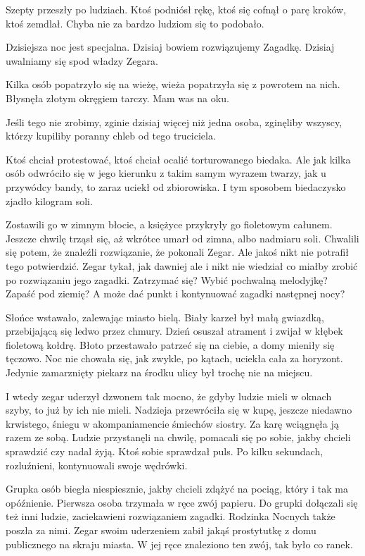 Szepty przeszły po ludziach.
Ktoś podniósł rękę, ktoś się cofnął o parę kroków, ktoś zemdlał.
Chyba nie za bardzo ludziom się to podobało.
\begin{dialogue}
	\ds{} Dzisiejsza noc jest specjalna. Dzisiaj bowiem rozwiązujemy Zagadkę. Dzisiaj uwalniamy się spod władzy Zegara.
\end{dialogue}
Kilka osób popatrzyło się na wieżę, wieża popatrzyła się z powrotem na nich. Błysnęła złotym okręgiem tarczy. Mam was na oku.
\begin{dialogue}
	\ds{} Jeśli tego nie zrobimy, zginie dzisiaj więcej niż jedna osoba, zginęliby wszyscy, którzy kupiliby poranny chleb od tego truciciela.
\end{dialogue}
Ktoś chciał protestować, ktoś chciał ocalić torturowanego biedaka.
Ale jak kilka osób odwróciło się w jego kierunku z takim samym wyrazem twarzy, jak u przywódcy bandy, to zaraz uciekł od zbiorowiska.
I tym sposobem biedaczysko zjadło kilogram soli.

Zostawili go w zimnym błocie, a księżyce przykryły go fioletowym całunem.
Jeszcze chwilę trząsł się, aż wkrótce umarł od zimna, albo nadmiaru soli.
Chwalili się potem, że znaleźli rozwiązanie, że pokonali Zegar.
Ale jakoś nikt nie potrafił tego potwierdzić. 
Zegar tykał, jak dawniej ale i nikt nie wiedział co miałby zrobić po rozwiązaniu jego zagadki.
Zatrzymać się? Wybić pochwalną melodyjkę? Zapaść pod ziemię? A może dać punkt i kontynuować zagadki następnej nocy?

Słońce wstawało, zalewając miasto bielą.
Biały karzeł był małą gwiazdką, przebijającą się ledwo przez chmury.
Dzień osuszał atrament i zwijał w kłębek fioletową kołdrę.
Błoto przestawało patrzeć się na ciebie, a domy mieniły się tęczowo.
Noc nie chowała się, jak zwykle, po kątach, uciekła cała za horyzont.
Jedynie zamarznięty piekarz na środku ulicy był trochę nie na miejscu.

I wtedy zegar uderzył dzwonem tak mocno, że gdyby ludzie mieli w oknach szyby, to już by ich nie mieli.
Nadzieja przewróciła się w kupę, jeszcze niedawno krwistego, śniegu w akompaniamencie śmiechów siostry.
Za karę wciągnęła ją razem ze sobą.
Ludzie przystanęli na chwilę, pomacali się po sobie, jakby chcieli sprawdzić czy nadal żyją.
Ktoś sobie sprawdzał puls.
Po kilku sekundach, rozluźnieni, kontynuowali swoje wędrówki.

Grupka osób biegła niespiesznie, jakby chcieli zdążyć na pociąg, który i tak ma opóźnienie.
Pierwsza osoba trzymała w ręce zwój papieru.
Do grupki dołączali się też inni ludzie, zaciekawieni rozwiązaniem zagadki.
Rodzinka Nocnych także poszła za nimi.
Zegar swoim uderzeniem zabił jakąś prostytutkę z domu publicznego na skraju miasta.
W jej ręce znaleziono ten zwój, tak było co ranek.

